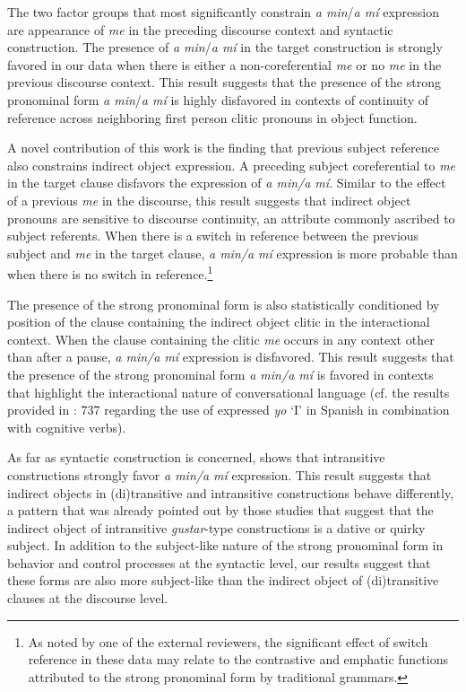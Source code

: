 \documentclass[output=paper]{langscibook}
\begin{document}
The two factor groups that most significantly constrain \textit{a min}\slash\textit{a mí} expression are appearance of \textit{me} in the preceding discourse context and syntactic construction. The presence of \textit{a min}\slash\textit{a mí} in the target construction is strongly favored in our data when there is either a non-coreferential \textit{me} or no \textit{me} in the previous discourse context. This result suggests that the presence of the strong pronominal form \textit{a min}\slash\textit{a mí} is highly disfavored in contexts of continuity of reference across neighboring first person clitic pronouns in object function. 

A novel contribution of this work is the finding that previous subject reference also constrains indirect object expression. A preceding subject coreferential to \textit{me} in the target clause disfavors the expression of \textit{a min\slash a mí}. Similar to the effect of a previous \textit{me} in the discourse, this result suggests that indirect object pronouns are sensitive to discourse continuity, an attribute commonly ascribed to subject referents. When there is a switch in reference between the previous subject and \textit{me} in the target clause, \textit{a min\slash a mí} expression is more probable than when there is no switch in reference.\footnote{As noted by one of the external reviewers, the significant effect of switch reference in these data may relate to the contrastive and emphatic functions attributed to the strong pronominal form by traditional grammars.} 

The presence of the strong pronominal form is also statistically conditioned by position of the clause containing the indirect object clitic in the interactional context. When the clause containing the clitic \textit{me} occurs in any context other than after a pause, \textit{a min\slash a mí} expression is disfavored. This result suggests that the presence of the strong pronominal form \textit{a min\slash a mí} is favored in contexts that highlight the interactional nature of conversational language (cf. the results provided in \citealt{TravisCacoullos2012}: 737 regarding the use of expressed \textit{yo} ‘I’ in Spanish in combination with cognitive verbs). 

As far as syntactic construction is concerned,  shows that intransitive constructions strongly favor \textit{a min\slash a mí} expression. This result suggests that indirect objects in (di)transitive and intransitive constructions behave differently, a pattern that was already pointed out by those studies that suggest that the indirect object of intransitive \textit{gustar}{}-type constructions is a dative or quirky subject. In addition to the subject-like nature of the strong pronominal form in behavior and control processes at the syntactic level, our results suggest that these forms are also more subject-like than the indirect object of (di)transitive clauses at the discourse level. 
\end{document}
